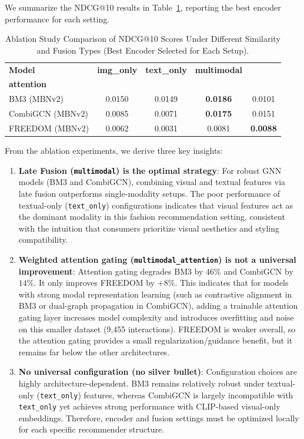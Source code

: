 We summarize the NDCG@10 results in Table~\ref{tab:ablation_summary}, reporting the best encoder performance for each setting.

\begin{table}[H]
\centering
\caption{Ablation Study Comparison of NDCG@10 Scores Under Different Similarity and Fusion Types (Best Encoder Selected for Each Setup).}
\label{tab:ablation_summary}
\small
\setlength{\tabcolsep}{6pt}
\begin{tabular}{lcccc}
\hline
\textbf{Model} & \textbf{img\_only} & \textbf{text\_only} & \textbf{multimodal} & \shortstack[c]{\textbf{multimodal\_}\\\textbf{attention}} \\ \hline
BM3 (MBNv2) & 0.0150 & 0.0149 & \textbf{0.0186} & 0.0101 \\
CombiGCN (MBNv2) & 0.0085 & 0.0071 & \textbf{0.0175} & 0.0151 \\
FREEDOM (MBNv2) & 0.0062 & 0.0031 & 0.0081 & \textbf{0.0088} \\ \hline
\end{tabular}
\end{table}

From the ablation experiments, we derive three key insights:
\begin{enumerate}
    \item \textbf{Late Fusion (\texttt{multimodal}) is the optimal strategy}: For robust GNN models (BM3 and CombiGCN), combining visual and textual features via late fusion outperforms single-modality setups. The poor performance of textual-only (\texttt{text\_only}) configurations indicates that visual features act as the dominant modality in this fashion recommendation setting, consistent with the intuition that consumers prioritize visual aesthetics and styling compatibility.
    \item \textbf{Weighted attention gating (\texttt{multimodal\_attention}) is not a universal improvement}: Attention gating degrades BM3 by $46\%$ and CombiGCN by $14\%$. It only improves FREEDOM by $+8\%$. This indicates that for models with strong modal representation learning (such as contrastive alignment in BM3 or dual-graph propagation in CombiGCN), adding a trainable attention gating layer increases model complexity and introduces overfitting and noise on this smaller dataset (9,455 interactions). FREEDOM is weaker overall, so the attention gating provides a small regularization/guidance benefit, but it remains far below the other architectures.
    \item \textbf{No universal configuration (no silver bullet)}: Configuration choices are highly architecture-dependent. BM3 remains relatively robust under textual-only (\texttt{text\_only}) features, whereas CombiGCN is largely incompatible with \texttt{text\_only} yet achieves strong performance with CLIP-based visual-only embeddings. Therefore, encoder and fusion settings must be optimized locally for each specific recommender structure.
\end{enumerate}

